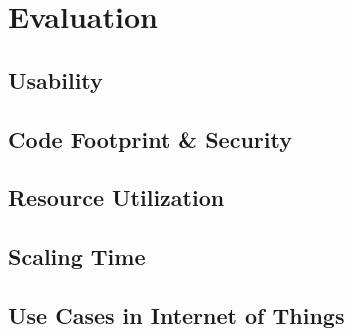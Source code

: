 \chapter{Evaluation}\label{chapter:evaluation}
\section{Usability}
\section{Code Footprint \& Security}
\section{Resource Utilization}
\section{Scaling Time}
\section{Use Cases in Internet of Things}